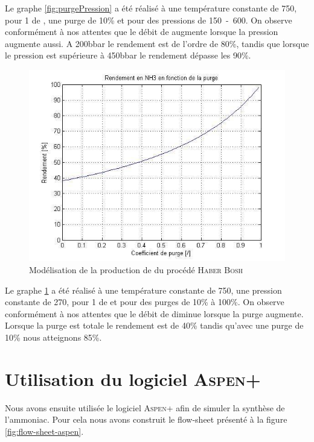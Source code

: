 Le graphe \ref{fig:purgePression} a été réalisé à une température constante de \unit{750}{\kelvin}, pour \unit{1}{\mole\per\second} de , une purge de 10\% et pour des pressions de \unit{150-600}{\bbar}. On observe conformément à nos attentes que le débit de  augmente lorsque la pression augmente aussi. A \unit{200}{bbar} le rendement est de l'ordre de 80\%, tandis que lorsque le pression est supérieure à \unit{450}{bbar} le rendement dépasse les 90\%.


\begin{figure}
	\centering
	\includegraphics[scale=0.5]{media/purge.jpg} 
	\caption{Modélisation de la production de  du procédé \textsc{Haber Bosh}}
	\label{fig:purge}
\end{figure}

Le graphe \ref{fig:purge} a été réalisé à une température constante de \unit{750}{\kelvin}, une pression constante de \unit{270}{\bbar}, pour \unit{1}{\mole\per\second} de  et pour des purges de 10\% à 100\%. On observe conformément à nos attentes que le débit de  diminue lorsque la purge augmente. Lorsque la purge est totale le rendement est de 40\% tandis qu'avec une purge de 10\% nous atteignons 85\%.


\section{Utilisation du logiciel \textsc{Aspen+}}
Nous avons ensuite utilisée le logiciel \textsc{Aspen+}
afin de simuler la synthèse de l'ammoniac. Pour cela
nous avons construit le flow-sheet présenté à la figure
\ref{fig:flow-sheet-aspen}. 

